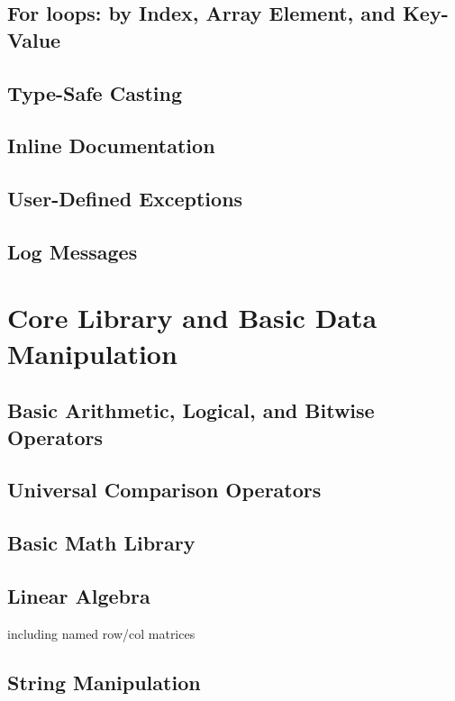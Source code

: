 \documentclass{article}
\begin{document}
\subsection{For loops: by Index, Array Element, and Key-Value}

\subsection{Type-Safe Casting}

\subsection{Inline Documentation}

\subsection{User-Defined Exceptions}

\subsection{Log Messages}

\pagebreak

\section{Core Library and Basic Data Manipulation}

\subsection{Basic Arithmetic, Logical, and Bitwise Operators}

\subsection{Universal Comparison Operators}

\subsection{Basic Math Library}

\subsection{Linear Algebra}

including named row/col matrices

\subsection{String Manipulation}
\end{document}
